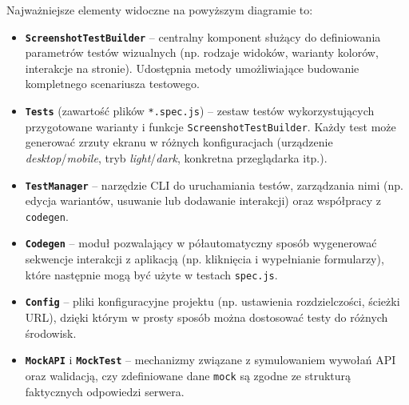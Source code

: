 \documentclass[12pt]{report}
\begin{document}
Najważniejsze elementy widoczne na powyższym diagramie to:
\begin{itemize}
    \item \textbf{\texttt{ScreenshotTestBuilder}} -- centralny komponent służący do definiowania parametrów testów wizualnych (np. rodzaje widoków, warianty kolorów, interakcje na stronie). Udostępnia metody umożliwiające budowanie kompletnego scenariusza testowego.
    \item \textbf{\texttt{Tests}} (zawartość plików \texttt{*.spec.js}) -- zestaw testów wykorzystujących przygotowane warianty i funkcje \texttt{ScreenshotTestBuilder}. Każdy test może generować zrzuty ekranu w różnych konfiguracjach (urządzenie \emph{desktop}/\emph{mobile}, tryb \emph{light}/\emph{dark}, konkretna przeglądarka itp.).
    \item \textbf{\texttt{TestManager}} -- narzędzie CLI do uruchamiania testów, zarządzania nimi (np. edycja wariantów, usuwanie lub dodawanie interakcji) oraz współpracy z \texttt{codegen}.
    \item \textbf{\texttt{Codegen}} -- moduł pozwalający w półautomatyczny sposób wygenerować sekwencje interakcji z aplikacją (np. kliknięcia i wypełnianie formularzy), które następnie mogą być użyte w testach \texttt{spec.js}.
    \item \textbf{\texttt{Config}} -- pliki konfiguracyjne projektu (np. ustawienia rozdzielczości, ścieżki URL), dzięki którym w prosty sposób można dostosować testy do różnych środowisk.
    \item \textbf{\texttt{MockAPI}} i \textbf{\texttt{MockTest}} -- mechanizmy związane z symulowaniem wywołań API oraz walidacją, czy zdefiniowane dane \texttt{mock} są zgodne ze strukturą faktycznych odpowiedzi serwera.
\end{itemize}
\end{document}
